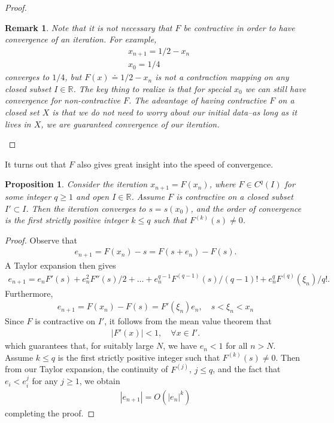 \documentclass[12pt,reqno]{amsart}
\numberwithin{equation}{section}  %
\newcommand{\rr}{\mathbb{R}}
\newtheorem{proposition}[theorem]{Proposition}
\newtheorem{remark}[theorem]{Remark}
\begin{document}
\begin{proof}
\begin{remark}
Note that it is not necessary that $F$ be contractive in order to 
have convergence of an iteration. For example,
\begin{align*}
& x_{n+1} = 1/2 - x_n
\\
& x_0 = 1/4
\end{align*}
converges to $1/4$, but $F(x) \doteq 1/2 - x_n$ is not a contraction mapping
on any closed subset $I \in \rr$. The key thing to realize is that
for \emph{special} $x_0$ we can still have convergence for non-contractive $F$.
The advantage of having contractive $F$ on a closed set $X$ is that we do not need to worry
about our initial data--as long as it lives in $X$,
we are guaranteed convergence of our iteration.
\end{remark}
\end{proof}
It turns out that $F$ also gives great insight into the speed
of convergence.
\begin{proposition}
Consider the iteration $x_{n+1} = F(x_n)$, where $F \in C^{q}(I)$ for some integer
$q \ge 1$ and open $I \in \rr$. Assume $F$ is contractive on a closed subset $I' \subset I$.
Then the iteration
converges to $s = s(x_0)$, and the order of convergence is the first strictly positive integer $k \le q$
such that $F^{(k)}(s) \neq 0$.
\end{proposition}
\begin{proof}
Observe that
\begin{align*}
e_{n+1} = F(x_n) - s = F(s + e_n) - F(s).
\end{align*}
A Taylor expansion then gives
\begin{align*}
e_{n+1} = e_nF'(s) + e_n^2 F''(s)/2 + \ldots + e_n^{q-1}F^{(q-1)}(s)/(q-1)! + 
e_n^q F^{(q)}(\xi_n)/q!.
\end{align*}
Furthermore,
\begin{align*}
e_{n+1} = F(x_n) - F(s) = F'(\xi_n)e_n, \quad s < \xi_n < x_n
\end{align*}
Since $F$ is contractive on $I'$, it follows from the mean value theorem that 
\begin{align*}
| F'(x) | < 1, \quad \forall x \in I'.
\end{align*}
which guarantees that, for suitably large $N$, we have $e_n < 1$ for all $n > N$.
Assume $k \le q$ is the first strictly positive integer such that $F^{(k)}(s) \neq 0$. Then from our
Taylor expansion, the continuity of $F^{(j)}$, $j \le q$, and the fact that
$e_i < e_i^j$ for any $j \ge 1$, we obtain
\begin{align*}
|e_{n+1}| = O(|e_n|^k)
\end{align*}
completing the proof.
\end{proof}
\end{document}
